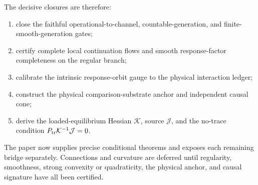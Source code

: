\documentclass[11pt]{article}
\theoremstyle{remark}
\newcommand{\Ptr}{P_{\rm tr}}
\begin{document}
\begin{center}
\end{center}

The decisive closures are therefore:
\begin{enumerate}
\item close the faithful operational-to-channel, countable-generation, and
finite-smooth-generation gates;
\item certify complete local continuation flows and smooth response-factor
completeness on the regular branch;
\item calibrate the intrinsic response-orbit gauge to the physical interaction
ledger;
\item construct the physical comparison-substrate anchor and independent causal
cone;
\item derive the loaded-equilibrium Hessian $\mathcal K$, source $\mathcal J$,
and the no-trace condition $\Ptr\mathcal K^{-1}\mathcal J=0$.
\end{enumerate}
The paper now supplies precise conditional theorems and exposes each remaining
bridge separately.  Connections and curvature are deferred until regularity,
smoothness, strong convexity or quadraticity, the physical anchor, and causal
signature have all been certified.
\end{document}

